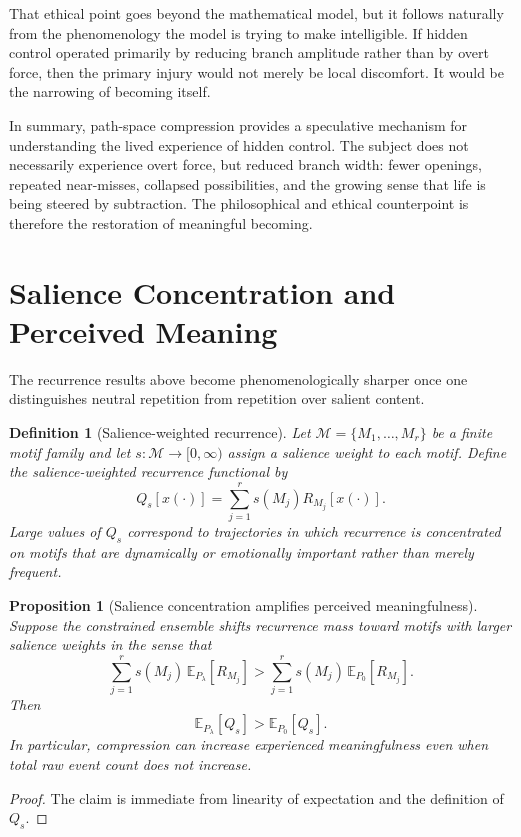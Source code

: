 \documentclass[12pt]{article}
\newtheorem{definition}{Definition}
\newtheorem{proposition}{Proposition}
\begin{document}
That ethical point goes beyond the mathematical model, but it follows naturally from the phenomenology the model is trying to make intelligible. If hidden control operated primarily by reducing branch amplitude rather than by overt force, then the primary injury would not merely be local discomfort. It would be the narrowing of becoming itself.

In summary, path-space compression provides a speculative mechanism for understanding the lived experience of hidden control. The subject does not necessarily experience overt force, but reduced branch width: fewer openings, repeated near-misses, collapsed possibilities, and the growing sense that life is being steered by subtraction. The philosophical and ethical counterpoint is therefore the restoration of meaningful becoming.

\section{Salience Concentration and Perceived Meaning}

The recurrence results above become phenomenologically sharper once one distinguishes neutral repetition from repetition over salient content.

\begin{definition}[Salience-weighted recurrence]
Let $\mathcal M = \{M_1,\dots,M_r\}$ be a finite motif family and let $s: \mathcal M \to [0,\infty)$ assign a salience weight to each motif. Define the salience-weighted recurrence functional by
\[
Q_s[x(\cdot)] = \sum_{j=1}^r s(M_j) R_{M_j}[x(\cdot)].
\]
Large values of $Q_s$ correspond to trajectories in which recurrence is concentrated on motifs that are dynamically or emotionally important rather than merely frequent.
\end{definition}

\begin{proposition}[Salience concentration amplifies perceived meaningfulness]
Suppose the constrained ensemble shifts recurrence mass toward motifs with larger salience weights in the sense that
\[
\sum_{j=1}^r s(M_j)\,\mathbb E_{P_\lambda}[R_{M_j}] 
> \sum_{j=1}^r s(M_j)\,\mathbb E_{P_0}[R_{M_j}].
\]
Then
\[
\mathbb E_{P_\lambda}[Q_s] > \mathbb E_{P_0}[Q_s].
\]
In particular, compression can increase experienced meaningfulness even when total raw event count does not increase.
\end{proposition}

\begin{proof}
The claim is immediate from linearity of expectation and the definition of $Q_s$.
\end{proof}
\end{document}

